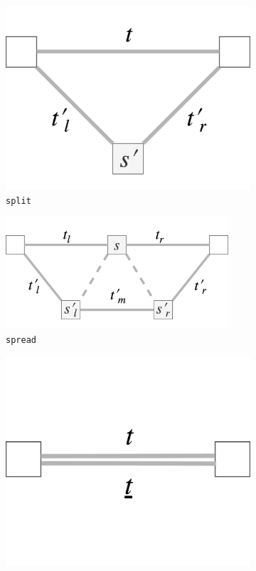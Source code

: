 \documentclass[12pt,a4paper,twoside,openright]{report}
\theoremstyle{definition}
\begin{document}
\begin{figure}
  \centering
  \begin{subfigure}[t]{.28\textwidth}
    \centering\includegraphics[keepaspectratio,width=\textwidth]{prep/outer/split}
    \caption{\texttt{split}}
    \label{fig:splitOp}
  \end{subfigure}
  \begin{subfigure}[t]{.46\textwidth}
    \centering\includegraphics[keepaspectratio,width=0.91\textwidth]{prep/outer/spread}
    \caption{\texttt{spread}}
    \label{fig:spreadOP}
  \end{subfigure}
  \begin{subfigure}[t]{.24\textwidth}
    \centering\includegraphics[keepaspectratio,width=\textwidth]{prep/outer/freeze}

\end{subfigure}
\end{figure}
\end{document}
